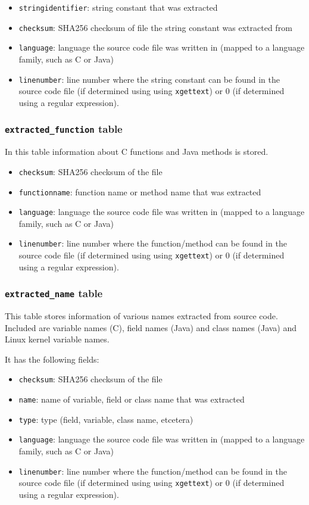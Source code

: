 \documentclass[10pt,a4paper]{article}
\begin{document}
\begin{itemize}
\item \texttt{stringidentifier}: string constant that was extracted
\item \texttt{checksum}: SHA256 checksum of file the string constant was
extracted from
\item \texttt{language}: language the source code file was written in (mapped
to a language family, such as C or Java)
\item \texttt{linenumber}: line number where the string constant can be found
in the source code file (if determined using using \texttt{xgettext}) or $0$
(if determined using a regular expression).
\end{itemize}

\subsubsection{\texttt{extracted\_function} table}

In this table information about C functions and Java methods is stored.

\begin{itemize}
\item \texttt{checksum}: SHA256 checksum of the file
\item \texttt{functionname}: function name or method name that was extracted
\item \texttt{language}: language the source code file was written in (mapped
to a language family, such as C or Java)
\item \texttt{linenumber}: line number where the function/method can be found
in the source code file (if determined using using \texttt{xgettext}) or $0$
(if determined using a regular expression).
\end{itemize}

\subsubsection{\texttt{extracted\_name} table}
This table stores information of various names extracted from source code.
Included are variable names (C), field names (Java) and class names (Java) and
Linux kernel variable names.

It has the following fields:

\begin{itemize}
\item \texttt{checksum}: SHA256 checksum of the file
\item \texttt{name}: name of variable, field or class name that was extracted
\item \texttt{type}: type (field, variable, class name, etcetera)
\item \texttt{language}: language the source code file was written in (mapped
to a language family, such as C or Java)
\item \texttt{linenumber}: line number where the function/method can be found
in the source code file (if determined using using \texttt{xgettext}) or $0$
(if determined using a regular expression).
\end{itemize}
\end{document}
